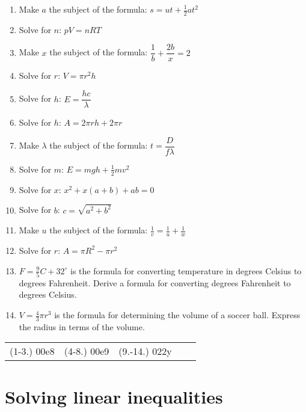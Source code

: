 \begin{exercises}{}
{
\begin{enumerate}[itemsep=5pt, label=\textbf{\arabic*}. ] 
\item Make $a$ the subject of the formula: $s=ut+\frac{1}{2}at^{2}$
\item Solve for $n$: $pV=nRT$ 
\item Make $x$ the subject of the formula: $\dfrac{1}{b}+\dfrac{2b}{x}=2$
\item Solve for $r$: $V = \pi r^{2} h$
\item Solve for $h$: $E=\dfrac{hc}{\lambda}$
\item Solve for $h$: $A=2\pi rh + 2 \pi r$
\item Make $\lambda$ the subject of the formula: $t=\dfrac{D}{f \lambda}$
\item Solve for $m$: $E=mgh + \frac{1}{2}mv^{2}$
\item Solve for $x$: $x^2+x(a+b)+ab=0$
\item Solve for $b$: $c=\sqrt{a^2+b^2}$
\item Make $u$ the subject of the formula: $\frac{1}{v}=\frac{1}{u}+\frac{1}{w}$
\item Solve for $r$: $A=\pi R^2 -\pi r^2$
\item $F=\frac{9}{5}C + 32^\circ$ is the formula for converting temperature in degrees Celsius to degrees Fahrenheit. Derive a formula for converting degrees Fahrenheit to degrees Celsius.
\item $V=\frac{4}{3}\pi r^3$ is the formula for determining the volume of a soccer ball. Express the radius in terms of the volume.
\end{enumerate}
\practiceinfo
\par 
\par \begin{tabular}[h]{ccccc}
(1-3.) 00e8&   (4-8.) 00e9 & (9.-14.) 022y\end{tabular}
}
\end{exercises}

\section{Solving linear inequalities}
\nopagebreak

